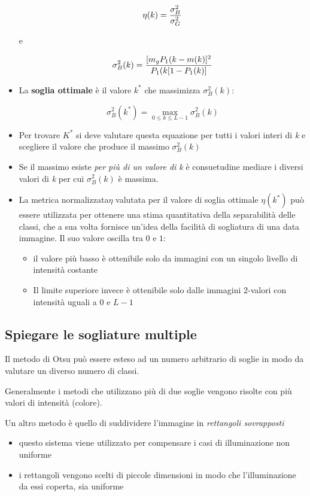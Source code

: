 \begin{itemize}
$$
\eta(k) = {\sigma_{B}^{2} \over \sigma_{G}^{2}}
$$

e

$$
{\sigma_{B}^{2}(k)} = {[{m_g P_1(k} - m(k)]^2 \over {P_1(k}[1 - P_1(k)]}
$$

\item La \textbf{soglia ottimale} è il valore $k^*$ che massimizza $\sigma_{B}^{2}(k)$:

$$
\sigma_{B}^{2}(k^*) = \max_{0 \leq k \leq L-1} \sigma_{B}^{2}(k)
$$

\item Per trovare $K^*$ si deve valutare questa equazione per tutti i valori interi di \textit{k} e scegliere il valore che produce il massimo  $\sigma_{B}^{2}(k)$

\item Se il massimo esiste \textit{per più di un valore di k} è consuetudine mediare i diversi valori di \textit{k} per cui $\sigma_{B}^{2}(k)$ è massima.

\item La metrica normalizzata$\eta$ valutata per il valore di soglia ottimale $\eta(k^*)$ può essere utilizzata per ottenere una stima quantitativa della separabilità delle classi, che a sua volta fornisce un'idea della facilità di
sogliatura di una data immagine. Il suo valore oscilla tra $0$ e $1$:

\begin{itemize}
\item il valore più basso è ottenibile solo da immagini con un singolo livello di intensità costante
\item Il limite superiore invece è ottenibile solo dalle immagini 2-valori con intensità uguali a $0$ e $L-1$
\end{itemize}

\end{itemize}

\subsection{Spiegare le sogliature multiple}
Il metodo di Otsu può essere esteso ad un numero arbitrario di soglie in modo da valutare un diverso numero di classi.

Generalmente i metodi che utilizzano più di due soglie vengono risolte con più valori di intensità (colore).

Un altro metodo è quello di suddividere l'immagine in \textit{rettangoli sovrapposti}

\begin{itemize}
\item questo sistema viene utilizzato per compensare i casi di illuminazione non uniforme
\item i rettangoli vengono scelti di piccole dimensioni in modo che l'illuminazione da essi coperta, sia uniforme
\end{itemize}

